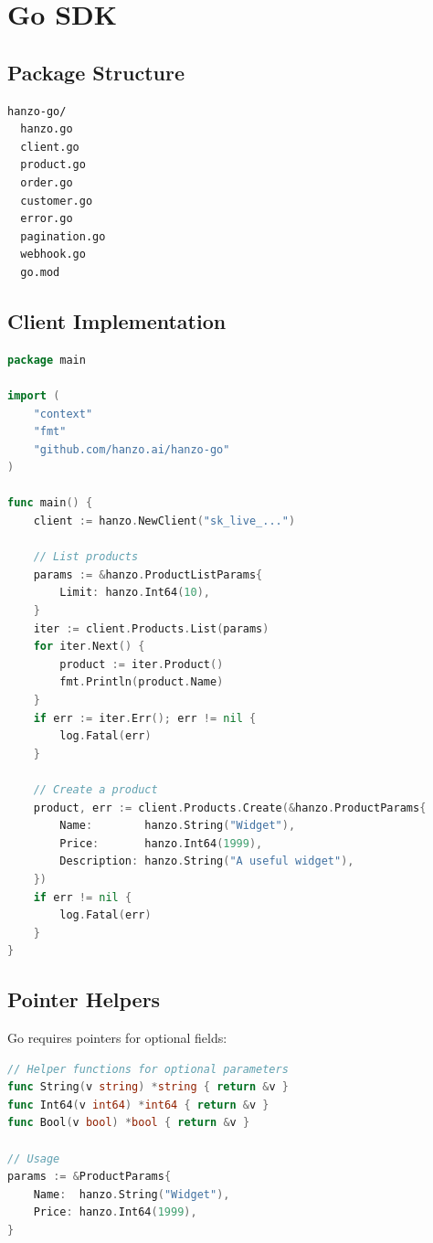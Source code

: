 \section{Go SDK}


\subsection{Package Structure}

\begin{lstlisting}[caption=Go SDK Structure]
hanzo-go/
  hanzo.go
  client.go
  product.go
  order.go
  customer.go
  error.go
  pagination.go
  webhook.go
  go.mod
\end{lstlisting}

\subsection{Client Implementation}

\begin{lstlisting}[language=Go, caption=Go Client]
package main

import (
    "context"
    "fmt"
    "github.com/hanzo.ai/hanzo-go"
)

func main() {
    client := hanzo.NewClient("sk_live_...")

    // List products
    params := &hanzo.ProductListParams{
        Limit: hanzo.Int64(10),
    }
    iter := client.Products.List(params)
    for iter.Next() {
        product := iter.Product()
        fmt.Println(product.Name)
    }
    if err := iter.Err(); err != nil {
        log.Fatal(err)
    }

    // Create a product
    product, err := client.Products.Create(&hanzo.ProductParams{
        Name:        hanzo.String("Widget"),
        Price:       hanzo.Int64(1999),
        Description: hanzo.String("A useful widget"),
    })
    if err != nil {
        log.Fatal(err)
    }
}
\end{lstlisting}

\subsection{Pointer Helpers}

Go requires pointers for optional fields:

\begin{lstlisting}[language=Go, caption=Go Pointer Helpers]
// Helper functions for optional parameters
func String(v string) *string { return &v }
func Int64(v int64) *int64 { return &v }
func Bool(v bool) *bool { return &v }

// Usage
params := &ProductParams{
    Name:  hanzo.String("Widget"),
    Price: hanzo.Int64(1999),
}
\end{lstlisting}


